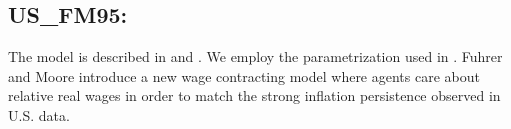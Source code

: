 \documentclass[11pt,a4paper]{article}
\begin{document}
	
	\subsection{US\_FM95: \cite{FuhrerMoore1995}}
	\label{USFM95}
	The model is described in \cite{FuhrerMoore1995} and \cite{FuhrerMoore1995a}. We employ the parametrization used in \cite{LevinWielandWilliams2003}.
	Fuhrer and Moore introduce a new wage contracting model where agents care about relative real wages in order to match the strong inflation persistence observed in U.S. data. %
\end{document}
